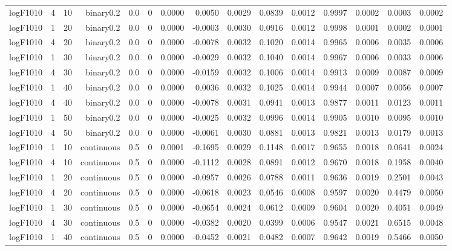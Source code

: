 \begin{longtable}{rrrrrrrrrrrrrrr}
  logF1010 & 4 & 10 & binary0.2 & 0.0 & 0 & 0.0000 & 0.0050 & 0.0029 & 0.0839 & 0.0012 & 0.9997 & 0.0002 & 0.0003 & 0.0002 \\ 
  logF1010 & 1 & 20 & binary0.2 & 0.0 & 0 & 0.0000 & -0.0003 & 0.0030 & 0.0916 & 0.0012 & 0.9998 & 0.0001 & 0.0002 & 0.0001 \\ 
  logF1010 & 4 & 20 & binary0.2 & 0.0 & 0 & 0.0000 & -0.0078 & 0.0032 & 0.1020 & 0.0014 & 0.9965 & 0.0006 & 0.0035 & 0.0006 \\ 
  logF1010 & 1 & 30 & binary0.2 & 0.0 & 0 & 0.0000 & -0.0029 & 0.0032 & 0.1040 & 0.0014 & 0.9967 & 0.0006 & 0.0033 & 0.0006 \\ 
  logF1010 & 4 & 30 & binary0.2 & 0.0 & 0 & 0.0000 & -0.0159 & 0.0032 & 0.1006 & 0.0014 & 0.9913 & 0.0009 & 0.0087 & 0.0009 \\ 
  logF1010 & 1 & 40 & binary0.2 & 0.0 & 0 & 0.0000 & 0.0036 & 0.0032 & 0.1025 & 0.0014 & 0.9944 & 0.0007 & 0.0056 & 0.0007 \\ 
  logF1010 & 4 & 40 & binary0.2 & 0.0 & 0 & 0.0000 & -0.0078 & 0.0031 & 0.0941 & 0.0013 & 0.9877 & 0.0011 & 0.0123 & 0.0011 \\ 
  logF1010 & 1 & 50 & binary0.2 & 0.0 & 0 & 0.0000 & -0.0025 & 0.0032 & 0.0996 & 0.0014 & 0.9905 & 0.0010 & 0.0095 & 0.0010 \\ 
  logF1010 & 4 & 50 & binary0.2 & 0.0 & 0 & 0.0000 & -0.0061 & 0.0030 & 0.0881 & 0.0013 & 0.9821 & 0.0013 & 0.0179 & 0.0013 \\ 
  logF1010 & 1 & 10 & continuous & 0.5 & 0 & 0.0001 & -0.1695 & 0.0029 & 0.1148 & 0.0017 & 0.9655 & 0.0018 & 0.0641 & 0.0024 \\ 
  logF1010 & 4 & 10 & continuous & 0.5 & 0 & 0.0000 & -0.1112 & 0.0028 & 0.0891 & 0.0012 & 0.9670 & 0.0018 & 0.1958 & 0.0040 \\ 
  logF1010 & 1 & 20 & continuous & 0.5 & 0 & 0.0000 & -0.0957 & 0.0026 & 0.0788 & 0.0011 & 0.9636 & 0.0019 & 0.2501 & 0.0043 \\ 
  logF1010 & 4 & 20 & continuous & 0.5 & 0 & 0.0000 & -0.0618 & 0.0023 & 0.0546 & 0.0008 & 0.9597 & 0.0020 & 0.4479 & 0.0050 \\ 
  logF1010 & 1 & 30 & continuous & 0.5 & 0 & 0.0000 & -0.0654 & 0.0024 & 0.0612 & 0.0009 & 0.9604 & 0.0020 & 0.4051 & 0.0049 \\ 
  logF1010 & 4 & 30 & continuous & 0.5 & 0 & 0.0000 & -0.0382 & 0.0020 & 0.0399 & 0.0006 & 0.9547 & 0.0021 & 0.6515 & 0.0048 \\ 
  logF1010 & 1 & 40 & continuous & 0.5 & 0 & 0.0000 & -0.0452 & 0.0021 & 0.0482 & 0.0007 & 0.9642 & 0.0019 & 0.5466 & 0.0050 \\ 

\end{longtable}
